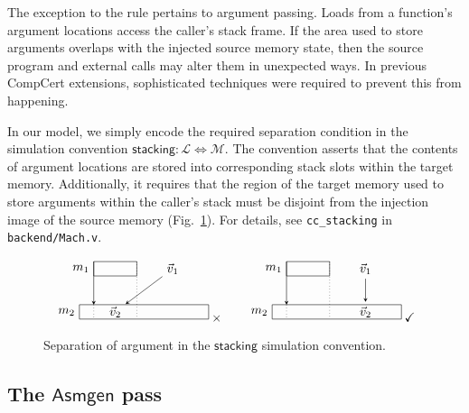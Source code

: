 \documentclass[draft,11pt]{report}
\theoremstyle{definition}
\newcommand{\kw}[1]{\ensuremath{ \mathsf{#1} }}
\begin{document}
The exception to the rule pertains to argument passing.
Loads from a function's argument locations
access the caller's stack frame.
If the area used to store arguments
overlaps with the injected source memory state,
then the source program and external calls
may alter them in unexpected ways.
In previous CompCert extensions,
sophisticated techniques were required
to prevent this from happening.

In our model,
we simply encode the required separation condition
in the simulation convention
$\kw{stacking} : \mathcal{L} \Leftrightarrow \mathcal{M}$.
The convention
asserts that the contents of argument locations
are stored into corresponding stack slots
within the target memory.
Additionally, it
requires that the region of the target memory
used to store arguments within the caller's stack
must be disjoint from the injection image of the source memory
(Fig.~\ref{fig:stacking}).
For details,
see \texttt{cc\_stacking} in \texttt{backend/Mach.v}.

\begin{figure}
\[
  \begin{tikzpicture}[scale=0.4,>=stealth]
    \draw ( 1,3) rectangle +(3,1); \node[left] at (1,3.5) {$m_1$};
    \draw ( 0,0) rectangle +(9,1); \node[left] at (0,0.5) {$m_2$};
    \node (V1) at (6.5,3.5) {$\vec{v}_1$};
    \node (V2) at (2.5,0.5) {$\vec{v}_2$};
    \draw[->] (1,4) -- (1,1); \draw[dotted] (1,1) -- (1,0); \draw[dotted] (4,4) -- (4,0);
    \draw[->] (V1) -- (V2);
  \end{tikzpicture}
  \:{\times}
  \qquad
  \begin{tikzpicture}[scale=0.4,>=stealth]
    \draw ( 1,3) rectangle +(3,1); \node[left] at (1,3.5) {$m_1$};
    \draw ( 0,0) rectangle +(9,1); \node[left] at (0,0.5) {$m_2$};
    \node (V1) at (6.5,3.5) {$\vec{v}_1$};
    \node (V2) at (6.5,0.5) {$\vec{v}_2$};
    \draw[->] (1,4) -- (1,1); \draw[dotted] (1,1) -- (1,0); \draw[dotted] (4,4) -- (4,0);
    \draw[->] (V1) -- (V2);
  \end{tikzpicture}
  \:{\checkmark}
\]
  \caption{Separation of argument
    in the \kw{stacking} simulation convention.}
  \label{fig:stacking}
\end{figure}


\subsection{The \kw{Asmgen} pass} \label{sec:asmgen} %
\end{document}
